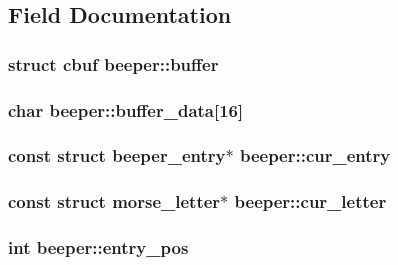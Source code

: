 \subsection{Field Documentation}
\hypertarget{structbeeper_ae9e6bbf81c3c24e59c1316297c14b595}{
\subsubsection[{buffer}]{\setlength{\rightskip}{0pt plus 5cm}struct cbuf beeper\+::buffer}}\label{structbeeper_ae9e6bbf81c3c24e59c1316297c14b595}
\hypertarget{structbeeper_a2e32a07faeb367ecd7763a5375d888e9}{
\subsubsection[{buffer\+\_\+data}]{\setlength{\rightskip}{0pt plus 5cm}char beeper\+::buffer\+\_\+data\mbox{[}16\mbox{]}}}\label{structbeeper_a2e32a07faeb367ecd7763a5375d888e9}
\hypertarget{structbeeper_a4619344c394ff4d8a1f09a37bf7e3c48}{
\subsubsection[{cur\+\_\+entry}]{\setlength{\rightskip}{0pt plus 5cm}const struct {\bf beeper\+\_\+entry}$\ast$ beeper\+::cur\+\_\+entry}}\label{structbeeper_a4619344c394ff4d8a1f09a37bf7e3c48}
\hypertarget{structbeeper_ac15806fd0e71f244e12c425fb87b10b5}{
\subsubsection[{cur\+\_\+letter}]{\setlength{\rightskip}{0pt plus 5cm}const struct {\bf morse\+\_\+letter}$\ast$ beeper\+::cur\+\_\+letter}}\label{structbeeper_ac15806fd0e71f244e12c425fb87b10b5}
\hypertarget{structbeeper_af508264fa7f97731d34f27de9f36ee2b}{
\subsubsection[{entry\+\_\+pos}]{\setlength{\rightskip}{0pt plus 5cm}int beeper\+::entry\+\_\+pos}}\label{structbeeper_af508264fa7f97731d34f27de9f36ee2b}
